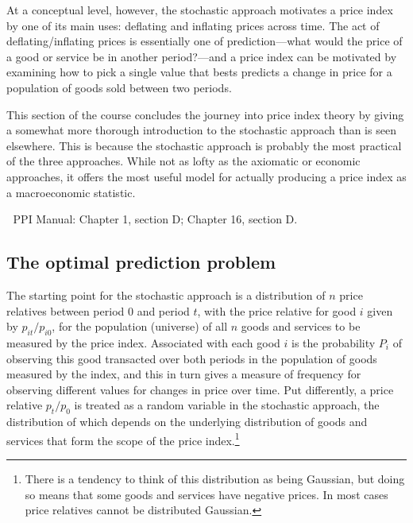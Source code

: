\documentclass[]{article}
\begin{document}
At a conceptual level, however, the stochastic approach motivates a price index by one of its main uses: deflating and inflating prices across time. The act of deflating/inflating prices is essentially one of prediction---what would the price of a good or service be in another period?---and a price index can be motivated by examining how to pick a single value that bests predicts a change in price for a population of goods sold between two periods.

This section of the course concludes the journey into price index theory by giving a somewhat more thorough introduction to the stochastic approach than is seen elsewhere. This is because the stochastic approach is probably the most practical of the three approaches. While not as lofty as the axiomatic or economic approaches, it offers the most useful model for actually producing a price index as a macroeconomic statistic.

📖 PPI Manual: Chapter 1, section D; Chapter 16, section D.

\hypertarget{the-optimal-prediction-problem}{%
\subsection{The optimal prediction problem}\label{the-optimal-prediction-problem}}

The starting point for the stochastic approach is a distribution of \(n\) price relatives between period 0 and period \(t\), with the price relative for good \(i\) given by \(p_{it} / p_{i0}\), for the population (universe) of all \(n\) goods and services to be measured by the price index. Associated with each good \(i\) is the probability \(P_{i}\) of observing this good transacted over both periods in the population of goods measured by the index, and this in turn gives a measure of frequency for observing different values for changes in price over time. Put differently, a price relative \(p_{t} / p_{0}\) is treated as a random variable in the stochastic approach, the distribution of which depends on the underlying distribution of goods and services that form the scope of the price index.\footnote{There is a tendency to think of this distribution as being Gaussian, but doing so means that some goods and services have negative prices. In most cases price relatives cannot be distributed Gaussian.}
\end{document}

